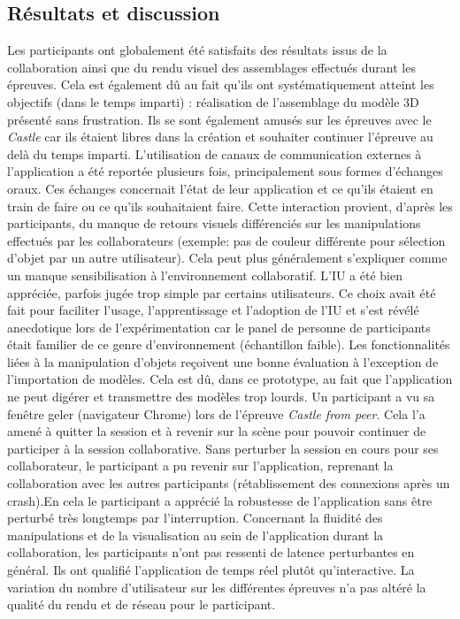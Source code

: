 \subsection{Résultats et discussion}
Les participants ont globalement été satisfaits des résultats issus de la 
collaboration ainsi que du rendu visuel des assemblages effectués durant les 
épreuves. Cela est également dû au fait qu'ils ont systématiquement atteint les 
objectifs (dans le temps imparti) : réalisation de l'assemblage du modèle 3D 
présenté sans frustration. Ils se sont également \og amusés\fg{} sur les épreuves
avec le \textit{Castle} car ils étaient libres dans la création et souhaiter continuer 
l'épreuve au delà du temps imparti. L'utilisation de canaux de communication 
externes à l'application a été reportée plusieurs fois, principalement sous formes 
d'échanges oraux. Ces échanges concernait l'état de leur application et ce qu'ils 
étaient en train de faire ou ce qu'ils souhaitaient faire. Cette interaction provient, 
d'après les participants, du manque de retours visuels différenciés sur les 
manipulations effectués par les collaborateurs (exemple: pas de couleur différente 
pour sélection d'objet par un autre utilisateur). Cela peut plus généralement 
s'expliquer comme un manque sensibilisation à l'environnement collaboratif. 
L'\gls{IU} a été bien appréciée, parfois jugée \og trop simple\fg{} par certains 
utilisateurs. Ce choix avait été fait pour faciliter l'usage, l'apprentissage et 
l'adoption de l'\gls{IU} et s'est révélé anecdotique lors de l'expérimentation car le 
panel de personne de participants était familier de ce genre 
d'environnement (échantillon faible).
Les fonctionnalités liées à la manipulation d'objets reçoivent une bonne évaluation 
à l'exception de l'importation de modèles. Cela est dû, dans ce prototype, au 
fait que l'application ne peut digérer et transmettre des modèles trop lourds. Un 
participant a vu sa fenêtre \og geler\fg{} (navigateur Chrome) lors de l'épreuve 
\textit{Castle from peer}. Cela l'a amené à quitter la session et à revenir sur la 
scène pour pouvoir continuer de participer à la session collaborative. Sans 
perturber la session en cours pour ses collaborateur, le participant a pu revenir sur 
l'application, reprenant la collaboration avec les autres participants (rétablissement 
des connexions après un crash).En cela le participant a apprécié la robustesse de 
l'application sans être perturbé très longtemps par l'interruption.
Concernant la fluidité des manipulations et de la visualisation au sein de 
l'application durant la collaboration, les participants n'ont pas ressenti de latence 
perturbantes en général. Ils ont qualifié l'application de \og temps réel\fg{} plutôt 
qu'\og interactive\fg{}. La variation du nombre d'utilisateur sur les différentes 
épreuves n'a pas altéré la qualité du rendu et de réseau pour le participant.

